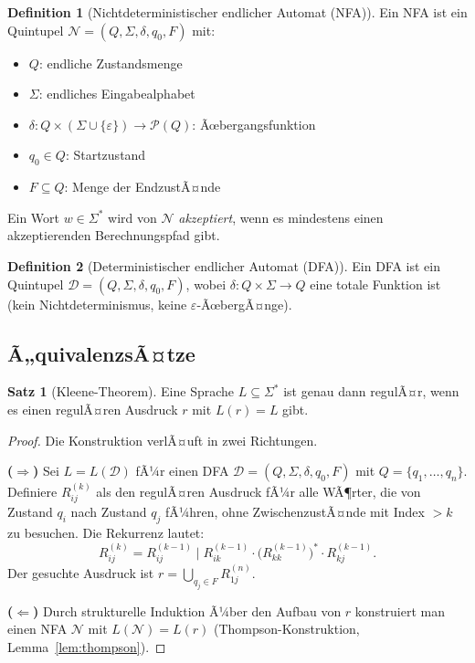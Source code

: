 ﻿\documentclass[a4paper,12pt]{article}
\theoremstyle{definition}
\newtheorem{definition}{Definition}
\newtheorem{satz}{Satz}
\begin{document}
\begin{definition}[Nichtdeterministischer endlicher Automat (NFA)]
	Ein NFA ist ein Quintupel $\mathcal{N} = (Q, \Sigma, \delta, q_0, F)$ mit:
	\begin{itemize}
		\item $Q$: endliche Zustandsmenge
		\item $\Sigma$: endliches Eingabealphabet
		\item $\delta: Q \times (\Sigma \cup \{\varepsilon\}) \to \mathcal{P}(Q)$:
		      Ãœbergangsfunktion
		\item $q_0 \in Q$: Startzustand
		\item $F \subseteq Q$: Menge der EndzustÃ¤nde
	\end{itemize}
	Ein Wort $w \in \Sigma^*$ wird von $\mathcal{N}$ \emph{akzeptiert}, wenn es
	mindestens einen akzeptierenden Berechnungspfad gibt.
\end{definition}

\begin{definition}[Deterministischer endlicher Automat (DFA)]
	Ein DFA ist ein Quintupel $\mathcal{D} = (Q, \Sigma, \delta, q_0, F)$, wobei
	$\delta: Q \times \Sigma \to Q$ eine totale Funktion ist (kein Nichtdeterminismus,
	keine $\varepsilon$-ÃœbergÃ¤nge).
\end{definition}

\subsection{Ã„quivalenzsÃ¤tze}

\begin{satz}[Kleene-Theorem]
	\label{satz:kleene}
	Eine Sprache $L \subseteq \Sigma^*$ ist genau dann regulÃ¤r, wenn es einen
	regulÃ¤ren Ausdruck $r$ mit $L(r) = L$ gibt.
\end{satz}

\begin{proof}
	Die Konstruktion verlÃ¤uft in zwei Richtungen.

	\textbf{($\Rightarrow$)} Sei $L = L(\mathcal{D})$ fÃ¼r einen DFA
	$\mathcal{D} = (Q, \Sigma, \delta, q_0, F)$ mit $Q = \{q_1, \ldots, q_n\}$.
	Definiere $R_{ij}^{(k)}$ als den regulÃ¤ren Ausdruck fÃ¼r alle WÃ¶rter, die von
	Zustand $q_i$ nach Zustand $q_j$ fÃ¼hren, ohne ZwischenzustÃ¤nde mit Index
	$> k$ zu besuchen. Die Rekurrenz lautet:
	\[
		R_{ij}^{(k)} = R_{ij}^{(k-1)} \mid R_{ik}^{(k-1)} \cdot
		\bigl(R_{kk}^{(k-1)}\bigr)^* \cdot R_{kj}^{(k-1)}.
	\]
	Der gesuchte Ausdruck ist $r = \bigcup_{q_j \in F} R_{1j}^{(n)}$.

	\textbf{($\Leftarrow$)} Durch strukturelle Induktion Ã¼ber den Aufbau von $r$
	konstruiert man einen NFA $\mathcal{N}$ mit $L(\mathcal{N}) = L(r)$
	(Thompson-Konstruktion, Lemma~\ref{lem:thompson}). \qedhere
\end{proof}
\end{document}
